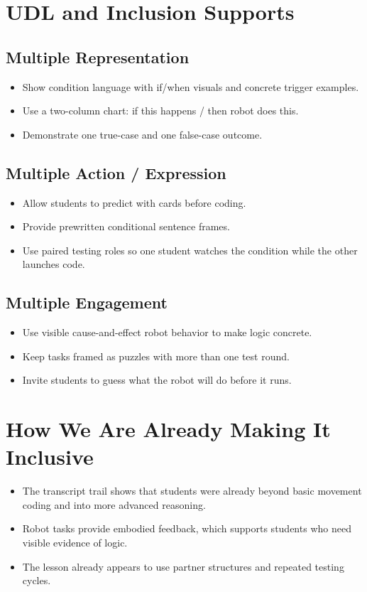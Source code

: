 \documentclass[11pt]{article}
\begin{document}
\section*{UDL and Inclusion Supports}
\subsection*{Multiple Representation}
\begin{itemize}[leftmargin=*]
\item Show condition language with if/when visuals and concrete trigger examples.
\item Use a two-column chart: if this happens / then robot does this.
\item Demonstrate one true-case and one false-case outcome.
\end{itemize}

\subsection*{Multiple Action / Expression}
\begin{itemize}[leftmargin=*]
\item Allow students to predict with cards before coding.
\item Provide prewritten conditional sentence frames.
\item Use paired testing roles so one student watches the condition while the other launches code.
\end{itemize}

\subsection*{Multiple Engagement}
\begin{itemize}[leftmargin=*]
\item Use visible cause-and-effect robot behavior to make logic concrete.
\item Keep tasks framed as puzzles with more than one test round.
\item Invite students to guess what the robot will do before it runs.
\end{itemize}

\section*{How We Are Already Making It Inclusive}
\begin{itemize}[leftmargin=*]
\item The transcript trail shows that students were already beyond basic movement coding and into more advanced reasoning.
\item Robot tasks provide embodied feedback, which supports students who need visible evidence of logic.
\item The lesson already appears to use partner structures and repeated testing cycles.
\end{itemize}
\end{document}
